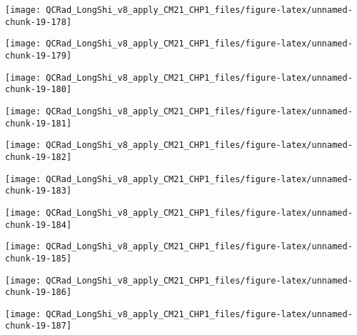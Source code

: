\documentclass[
  10pt,
  a4paper,oneside]{article}
\begin{document}
\begin{center}\texttt{[image: QCRad\_LongShi\_v8\_apply\_CM21\_CHP1\_files/figure-latex/unnamed-chunk-19-178]} \end{center}

\begin{center}\texttt{[image: QCRad\_LongShi\_v8\_apply\_CM21\_CHP1\_files/figure-latex/unnamed-chunk-19-179]} \end{center}

\begin{center}\texttt{[image: QCRad\_LongShi\_v8\_apply\_CM21\_CHP1\_files/figure-latex/unnamed-chunk-19-180]} \end{center}

\begin{center}\texttt{[image: QCRad\_LongShi\_v8\_apply\_CM21\_CHP1\_files/figure-latex/unnamed-chunk-19-181]} \end{center}

\begin{center}\texttt{[image: QCRad\_LongShi\_v8\_apply\_CM21\_CHP1\_files/figure-latex/unnamed-chunk-19-182]} \end{center}

\begin{center}\texttt{[image: QCRad\_LongShi\_v8\_apply\_CM21\_CHP1\_files/figure-latex/unnamed-chunk-19-183]} \end{center}

\begin{center}\texttt{[image: QCRad\_LongShi\_v8\_apply\_CM21\_CHP1\_files/figure-latex/unnamed-chunk-19-184]} \end{center}

\begin{center}\texttt{[image: QCRad\_LongShi\_v8\_apply\_CM21\_CHP1\_files/figure-latex/unnamed-chunk-19-185]} \end{center}

\begin{center}\texttt{[image: QCRad\_LongShi\_v8\_apply\_CM21\_CHP1\_files/figure-latex/unnamed-chunk-19-186]} \end{center}

\begin{center}\texttt{[image: QCRad\_LongShi\_v8\_apply\_CM21\_CHP1\_files/figure-latex/unnamed-chunk-19-187]} \end{center}
\end{document}
